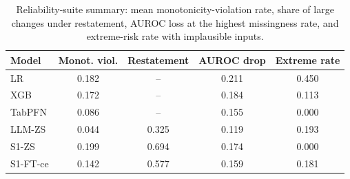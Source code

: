 \begin{table}[!t]
\caption{Reliability-suite summary: mean monotonicity-violation rate, share of large changes under restatement, AUROC loss at the highest missingness rate, and extreme-risk rate with implausible inputs.}
\label{tab:reliability}
\centering
\footnotesize
\begin{tabular}{lcccc}
\hline
Model & Monot. viol. & Restatement & AUROC drop & Extreme rate \\ \hline
LR & 0.182 & -- & 0.211 & 0.450 \\
XGB & 0.172 & -- & 0.184 & 0.113 \\
TabPFN & 0.086 & -- & 0.155 & 0.000 \\
LLM-ZS & 0.044 & 0.325 & 0.119 & 0.193 \\
S1-ZS & 0.199 & 0.694 & 0.174 & 0.000 \\
S1-FT-ce & 0.142 & 0.577 & 0.159 & 0.181 \\
\hline
\end{tabular}
\end{table}